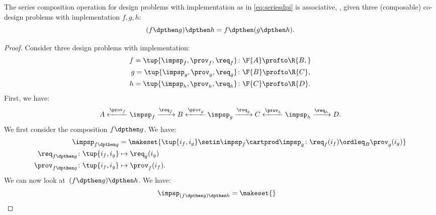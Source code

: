 {    \begin{lemma}
        The series composition operation for design problems with implementation as in \cref{eq:seriesdpi} is associative, \ie,  given three (composable) co-design problems with implementation $f,g,h$:
        \begin{equation}
            (f\dpthen g)
            \dpthen h = f\dpthen (g\dpthen h).
        \end{equation}
    \end{lemma}
    \begin{proof}
        Consider three design problems with implementation:
        \begin{equation}
            \begin{aligned}
                f=\tup{{\impsp_f, \prov_f, \req_f} } & \colon \F{A} \profto\R{B,} \\
                g=\tup{\impsp_g, \prov_g, \req_g}    & \colon \F{B} \profto \R{C}, \\
                h=\tup{\impsp_h, \prov_h, \req_h}    & \colon \F{C} \profto \R{D}.
            \end{aligned}
        \end{equation}
        First, we have:
        \begin{equation}
            A \xleftarrow{\prov_f} \impsp_f \xrightarrow{\req_f} B
            \xleftarrow{\prov_g} \impsp_g \xrightarrow{\req_g} C
            \xleftarrow{\prov_h} \impsp_h \xrightarrow{\req_h} D.
        \end{equation}
        We first consider the composition $f\dpthen g$.
        We have:
        \begin{equation}
            \begin{aligned}
                \impsp_{f\dpthen g}                       & = \makeset{
                    \tup{i_f,i_g} \setin \impsp_f \cartprod \impsp_g \colon
                    \req_f(i_f) \ordleq_{B} \prov_g(i_g)
                } \\
                \req_{f\dpthen g}  \colon  \tup{i_f,i_g}  & \mapsto \req_g(i_g) \\
                \prov_{f\dpthen g}  \colon  \tup{i_f,i_g} & \mapsto \prov_f(i_f).
            \end{aligned}
        \end{equation}
        We can now look at~$(f\dpthen g)\dpthen h$.
        We have:
        \begin{equation}
            \begin{aligned}
                 & \impsp_{(f\dpthen g)\dpthen h} = \makeset{
}
\end{aligned}
\end{equation}
\end{proof}}
